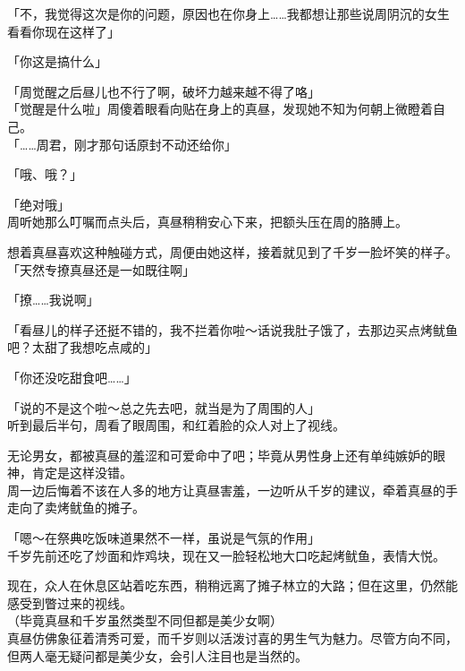 「不，我觉得这次是你的问题，原因也在你身上……我都想让那些说周阴沉的女生看看你现在这样了」

「你这是搞什么」

「周觉醒之后昼儿也不行了啊，破坏力越来越不得了咯」\\

「觉醒是什么啦」周傻着眼看向贴在身上的真昼，发现她不知为何朝上微瞪着自己。\\

「……周君，刚才那句话原封不动还给你」

「哦、哦？」

「绝对哦」\\

周听她那么叮嘱而点头后，真昼稍稍安心下来，把额头压在周的胳膊上。

想着真昼喜欢这种触碰方式，周便由她这样，接着就见到了千岁一脸坏笑的样子。\\

「天然专撩真昼还是一如既往啊」

「撩……我说啊」

「看昼儿的样子还挺不错的，我不拦着你啦～话说我肚子饿了，去那边买点烤鱿鱼吧？太甜了我想吃点咸的」

「你还没吃甜食吧……」

「说的不是这个啦～总之先去吧，就当是为了周围的人」\\

听到最后半句，周看了眼周围，和红着脸的众人对上了视线。

无论男女，都被真昼的羞涩和可爱命中了吧；毕竟从男性身上还有单纯嫉妒的眼神，肯定是这样没错。\\

周一边后悔着不该在人多的地方让真昼害羞，一边听从千岁的建议，牵着真昼的手走向了卖烤鱿鱼的摊子。\\

\vspace{2\baselineskip}

「嗯～在祭典吃饭味道果然不一样，虽说是气氛的作用」\\

千岁先前还吃了炒面和炸鸡块，现在又一脸轻松地大口吃起烤鱿鱼，表情大悦。

现在，众人在休息区站着吃东西，稍稍远离了摊子林立的大路；但在这里，仍然能感受到瞥过来的视线。\\

（毕竟真昼和千岁虽然类型不同但都是美少女啊）\\

真昼仿佛象征着清秀可爱，而千岁则以活泼讨喜的男生气为魅力。尽管方向不同，但两人毫无疑问都是美少女，会引人注目也是当然的。


